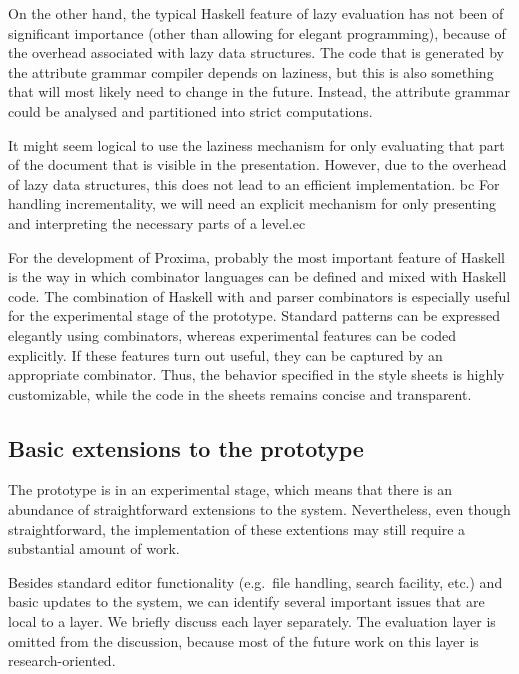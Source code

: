 On the other hand, the typical Haskell feature of lazy evaluation has not been of significant importance (other than allowing for elegant programming), because of the overhead associated with lazy data structures. The code that is generated by the attribute grammar compiler depends on laziness, but this is also something that will most likely need to change in the future. Instead, the attribute grammar could be analysed and partitioned into strict computations.

\bc
It might seem logical to use the laziness mechanism for only evaluating that part of the document that is visible in the presentation. However, due to the overhead of lazy data structures, this does not lead to an efficient implementation. bc For handling incrementality, we will need an explicit mechanism for only presenting and interpreting the necessary parts of a level.ec 
\ec

For the development of Proxima, probably the most important feature of Haskell is the way in which combinator languages can be defined and mixed with Haskell code. The combination of Haskell with {\Xprez}  and parser combinators is especially useful for the experimental stage of the prototype. Standard patterns can be expressed elegantly using combinators, whereas experimental features can be coded explicitly. If these features turn out useful, they can be captured by an appropriate combinator. Thus, the behavior specified in the style sheets is highly customizable, while the code in the sheets remains concise and transparent.


\subsection{Basic extensions to the prototype}

The prototype is in an experimental stage, which means that there is an abundance of straightforward extensions to the system. Nevertheless, even though  straightforward, the implementation of these extentions may still require a substantial amount of work. 

Besides standard editor functionality (e.g.\  file handling, search facility, etc.) and basic updates to the system, we can identify several important issues that are local to a layer. We briefly discuss each layer separately. The evaluation layer is omitted from the discussion, because most of the future work on this layer is research-oriented.

%
%

